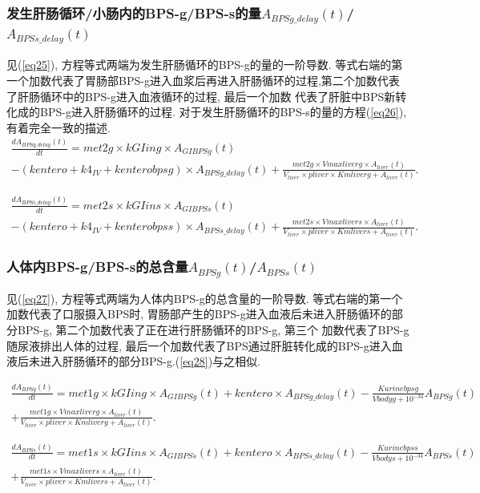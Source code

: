 \documentclass[a4paper,punct=banjiao,twoside]{ctexrep}
\theoremstyle{plain}
\theoremstyle{definition}
\theoremstyle{remark}
\begin{document}
\subsubsection*{发生肝肠循环/小肠内的BPS-g/BPS-s的量$A_{BPSg\_delay}(t)$/$A_{BPSs\_delay}(t)$}
见(\ref{eq25}), 方程等式两端为发生肝肠循环的BPS-g的量的一阶导数. 等式右端的第一个加数代表了胃肠部BPS-g进入血浆后再进入肝肠循环的过程,第二个加数代表了肝肠循环中的BPS-g进入血液循环的过程, 最后一个加数
代表了肝脏中BPS新转化成的BPS-g进入肝肠循环的过程. 对于发生肝肠循环的BPS-s的量的方程(\ref{eq26}), 有着完全一致的描述.
\begin{multline}\label{eq25}
  \frac{dA_{BPSg\_delay}(t)}{dt}=met2g \times  kGIing \times  A_{GIBPSg}(t)\\
  -(kentero+k4_{IV}+kenterobpsg) \times  A_{BPSg\_delay}(t)
  +\frac{met2g \times  Vmaxliverg \times  A_{liver}(t)}{V_{liver}  \times  pliver \times  Kmliverg+A_{liver}(t)}.
\end{multline}

\begin{multline}\label{eq26}
  \frac{dA_{BPSs\_delay}(t)}{dt}=met2s \times  kGIins \times  A_{GIBPSs}(t)\\
  -(kentero+k4_{IV}+kenterobpss) \times  A_{BPSs\_delay}(t)
  +\frac{met2s \times  Vmaxlivers \times  A_{liver}(t)}{V_{liver}  \times  pliver \times  Kmlivers+A_{liver}(t)}.
\end{multline}

\subsubsection*{人体内BPS-g/BPS-s的总含量$A_{BPSg}(t)$/$A_{BPSs}(t)$}
见(\ref{eq27}), 方程等式两端为人体内BPS-g的总含量的一阶导数. 等式右端的第一个加数代表了口服摄入BPS时, 胃肠部产生的BPS-g进入血液后未进入肝肠循环的部分BPS-g, 第二个加数代表了正在进行肝肠循环的BPS-g, 第三个
加数代表了BPS-g随尿液排出人体的过程, 最后一个加数代表了BPS通过肝脏转化成的BPS-g进入血液后未进入肝肠循环的部分BPS-g.(\ref{eq28})与之相似.

\begin{multline}\label{eq27}
  \frac{dA_{BPSg}(t)}{dt}=met1g \times  kGIing \times  A_{GIBPSg}(t)+kentero \times  A_{BPSg\_delay}(t)-\frac{Kurinebpsg}{Vbodyg+10^{-34} } A_{BPSg}(t)\\
  +\frac{met1g \times  Vmaxliverg \times  A_{liver}(t)}{V_{liver}  \times  pliver \times  Kmliverg+A_{liver}(t)}.
\end{multline}

\begin{multline}\label{eq28}
  \frac{dA_{BPSs}(t)}{dt}=met1s \times  kGIins \times  A_{GIBPSs}(t)+kentero \times  A_{BPSs\_delay}(t)-\frac{Kurinebpss}{Vbodys+10^{-34}} A_{BPSs}(t)\\
  +\frac{met1s \times  Vmaxlivers \times  A_{liver}(t)}{V_{liver}  \times  pliver \times  Kmlivers+A_{liver}(t)}.
\end{multline}
\end{document}
